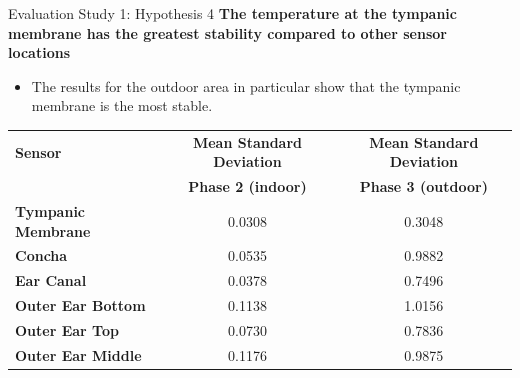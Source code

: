 \documentclass[en]{sdqbeamer}
\begin{document}

\begin{frame}{Evaluation Study 1: Hypothesis 4}
    \textbf{The temperature at the tympanic membrane has the greatest stability compared to other sensor locations}
    \begin{itemize}
        \item The results for the outdoor area in particular show that the tympanic membrane is the most stable.
    \end{itemize}
    \vspace{15pt}
    
        \begin{tabularx}{\textwidth}{|X|c|c|}
        \hline
        \textbf{Sensor} & \textbf{Mean Standard Deviation} & \textbf{Mean Standard Deviation} \\
        & \textbf{Phase 2 (indoor)} & \textbf{Phase 3 (outdoor)} \\
        \hline
        \textbf{Tympanic Membrane} & 0.0308 & 0.3048 \\
        \textbf{Concha} & 0.0535 & 0.9882 \\
        \textbf{Ear Canal} & 0.0378 & 0.7496 \\
        \textbf{Outer Ear Bottom} & 0.1138 & 1.0156 \\
        \textbf{Outer Ear Top} & 0.0730 & 0.7836 \\
        \textbf{Outer Ear Middle} & 0.1176 & 0.9875 \\
        \hline
        \end{tabularx}
\end{frame}
\end{document}
